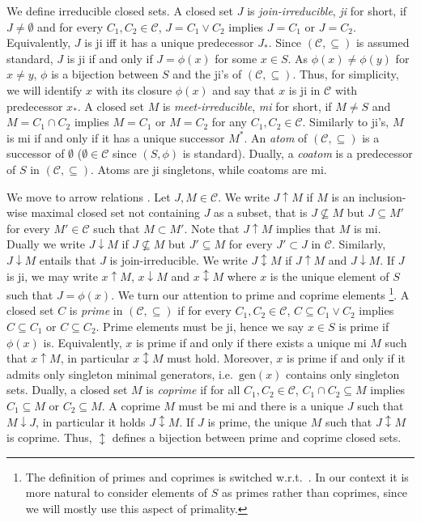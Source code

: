 \documentclass[12pt, a4paper]{article}
\newcommand{\cc}[1]{\mathcal{#1}}  %
\newcommand{\U}{S}  %
\DeclareMathOperator{\upp}{\uparrow}  %
\DeclareMathOperator{\downp}{\downarrow}  %
\DeclareMathOperator{\dpp}{\updownarrow}  %
\DeclareMathOperator{\jn}{\lor}  %
\newcommand{\cl}{\phi}  %
\newcommand{\cs}{\cc{C}} %
\newcommand{\gen}{\mathrm{gen}}  %
\begin{document}
We define irreducible closed sets.
A closed set $J$ is \emph{join-irreducible}, \emph{ji} for short, if $J \neq \emptyset$ and for every $C_1, C_2 \in \cs$, $J = C_1 \jn C_2$ implies $J = C_1$ or $J = C_2$.
Equivalently, $J$ is ji iff it has a unique predecessor $J_*$.
Since $(\cs, \subseteq)$ is assumed standard, $J$ is ji if and only if $J = \cl(x)$ for some $x \in \U$.
As $\cl(x) \neq \cl(y)$ for $x \neq y$, $\cl$ is a bijection between $\U$ and the ji's of $(\cs, \subseteq)$.
Thus, for simplicity, we will identify $x$ with its closure $\cl(x)$ and say that $x$ is ji in $\cs$ with predecessor $x_*$.
A closed set $M$ is \emph{meet-irreducible}, \emph{mi} for short, if $M \neq \U$ and $M = C_1 \cap C_2$ implies $M = C_1$ or $M = C_2$ for any $C_1, C_2 \in \cs$.
Similarly to ji's, $M$ is mi if and only if it has a unique successor $M^*$.
An \emph{atom} of $(\cs, \subseteq)$ is a successor of $\emptyset$ ($\emptyset \in \cs$ since $(\U, \cl)$ is standard).
Dually, a \emph{coatom} is a predecessor of $\U$ in $(\cs, \subseteq)$.
Atoms are ji singletons, while coatoms are mi.

We move to arrow relations \cite{ganter2012formal}.
Let $J, M \in \cs$.
We write $J \upp M$ if $M$ is an inclusion-wise maximal closed set not containing $J$ as a subset, that is $J \nsubseteq M$ but $J \subseteq M'$ for every $M' \in \cs$ such that $M \subset M'$.
Note that $J \upp M$ implies that $M$ is mi.
Dually we write $J \downp M$ if $J \nsubseteq M$ but $J' \subseteq M$ for every $J' \subset J$ in $\cs$.
Similarly, $J \downp M$ entails that $J$ is join-irreducible. 
We write $J \dpp M$ if $J \upp M$ and $J \downp M$.
If $J$ is ji, we may write $x \upp M$, $x \downp M$ and $x \dpp M$ where $x$ is the unique element of $\U$ such that $J = \cl(x)$.
We turn our attention to prime and coprime elements \cite{markowsky1992primes}\footnote{The definition of primes and coprimes is switched w.r.t.~\cite{markowsky1992primes}.
In our context it is more natural to consider elements of $\U$ as primes rather than coprimes, since we will mostly use this aspect of primality.}.
A closed set $C$ is \emph{prime} in $(\cs, \subseteq)$ if for every $C_1, C_2 \in \cs$, $C \subseteq C_1 \jn C_2$ implies $C \subseteq C_1$ or $C \subseteq C_2$.
Prime elements must be ji, hence we say $x \in \U$ is prime if $\cl(x)$ is.
Equivalently, $x$ is prime if and only if there exists a unique mi $M$ such that $x \upp M$, in particular $x \dpp M$ must hold.
Moreover, $x$ is prime if and only if it admits only singleton minimal generators, i.e.~$\gen(x)$ contains only singleton sets.
Dually, a closed set $M$ is \emph{coprime} if for all $C_1, C_2 \in \cs$, $C_1 \cap C_2 \subseteq M$ implies $C_1 \subseteq M$ or $C_2 \subseteq M$. 
A coprime $M$ must be mi and there is a unique $J$ such that $M \downp J$, in particular it holds $J \dpp M$.
If $J$ is prime, the unique $M$ such that $J \dpp M$ is coprime.
Thus, $\dpp$ defines a bijection between prime and coprime closed sets.
\end{document}
